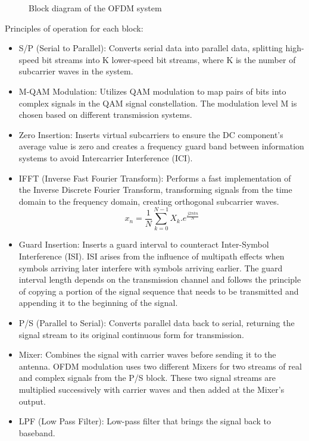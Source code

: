 \begin{figure}[htbp]
    \centering
    
    \caption{Block diagram of the OFDM system}
    \label{diagram}
\end{figure}

Principles of operation for each block:
\begin{itemize}
    \item S/P (Serial to Parallel): Converts serial data into parallel data, splitting high-speed bit streams into K lower-speed bit streams, where K is the number of subcarrier waves in the system.
    \item M-QAM Modulation: Utilizes QAM modulation to map pairs of bits into complex signals in the QAM signal constellation. The modulation level M is chosen based on different transmission systems.
    \item Zero Insertion: Inserts virtual subcarriers to ensure the DC component's average value is zero and creates a frequency guard band between information systems to avoid Intercarrier Interference (ICI).
    \item IFFT (Inverse Fast Fourier Transform): Performs a fast implementation of the Inverse Discrete Fourier Transform, transforming signals from the time domain to the frequency domain, creating orthogonal subcarrier waves.
    \begin{equation}
        x_n = \frac{1}{N} \sum_{k=0}^{N-1} X_k . e^\frac{j2\pi kn}{N}
    \end{equation}
    \item Guard Insertion: Inserts a guard interval to counteract Inter-Symbol Interference (ISI). ISI arises from the influence of multipath effects when symbols arriving later interfere with symbols arriving earlier. The guard interval length depends on the transmission channel and follows the principle of copying a portion of the signal sequence that needs to be transmitted and appending it to the beginning of the signal.
    \item P/S (Parallel to Serial): Converts parallel data back to serial, returning the signal stream to its original continuous form for transmission.
    \item Mixer: Combines the signal with carrier waves before sending it to the antenna. OFDM modulation uses two different Mixers for two streams of real and complex signals from the P/S block. These two signal streams are multiplied successively with carrier waves and then added at the Mixer's output.
    \item LPF (Low Pass Filter): Low-pass filter that brings the signal back to baseband.

\end{itemize}
